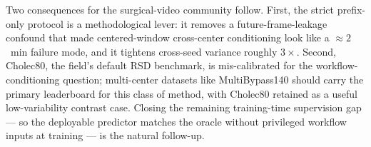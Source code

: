Two consequences for the surgical-video community follow. First, the
strict prefix-only protocol is a methodological lever: it removes a
future-frame-leakage confound that made centered-window cross-center
conditioning look like a $\approx 2$~min failure mode, and it tightens
cross-seed variance roughly $3\times$. Second, Cholec80, the field's
default RSD benchmark, is mis-calibrated for the workflow-conditioning
question; multi-center datasets like MultiBypass140 should carry the
primary leaderboard for this class of method, with Cholec80 retained as
a useful low-variability contrast case. Closing the remaining
training-time supervision gap --- so the deployable predictor matches
the oracle without privileged workflow inputs at training --- is the
natural follow-up.
